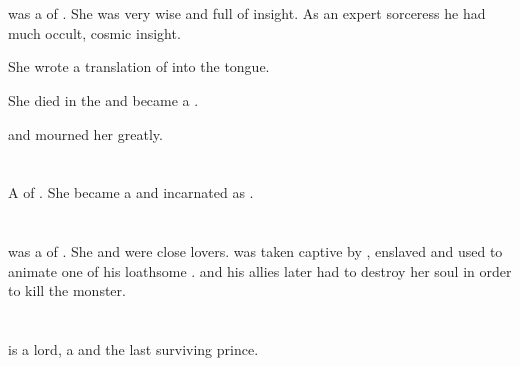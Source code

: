\section{\Essenai}
\index{\Essenai}
\Essenai was a \sathariah \resvil of \Kezerad.
She was very wise and full of insight.
As an expert sorceress he had much occult, cosmic insight. 

She wrote a translation of \WanderersInDarknessEmph into the \Resphan tongue.

She died in the  and became a \sephirah.

 and mourned her greatly.


















\section{\Eryal}
\index{\Eryal}
A \thelyad{} \resvil{} of \Kezerad. 
She became a \malach{} and incarnated as . 















\section{\Sevestris}
\index{\Sevestris}
\Sevestris was a \thelyad \resvil of \Kezerad. 
She and \Sithiyacaan were close lovers. 
\Sevestris was taken captive by \Secherdamon, enslaved and used to animate one of his loathsome \reptilecolossi.
\Sithiyacaan and his allies later had to destroy her soul in order to kill the monster.















\section[Sithiyacan]{\Sithiyacaan}
\index{\Sithiyacaan}
\Sithiyacaan{} is a \resphan{} lord, a \sathariah{} and the last surviving  prince. 


